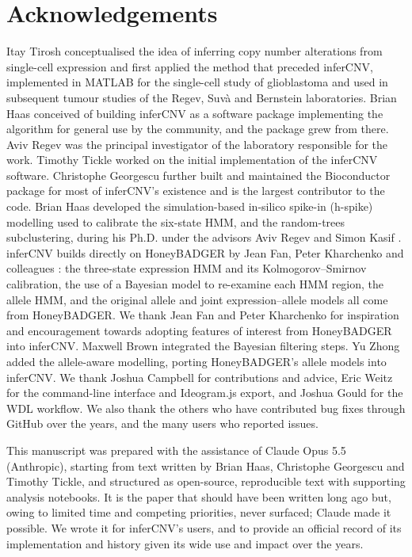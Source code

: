 \section*{Acknowledgements}\label{sec:acknowledgements}

Itay Tirosh conceptualised the idea of inferring copy number alterations from single-cell expression and first applied the method that preceded inferCNV, implemented in MATLAB for the single-cell study of glioblastoma \citep{patel2014} and used in subsequent tumour studies of the Regev, Suvà and Bernstein laboratories. Brian Haas conceived of building inferCNV as a software package implementing the algorithm for general use by the community, and the package grew from there. Aviv Regev was the principal investigator of the laboratory responsible for the work. Timothy Tickle worked on the initial implementation of the inferCNV software. Christophe Georgescu further built and maintained the Bioconductor package for most of inferCNV's existence and is the largest contributor to the code. Brian Haas developed the simulation-based in-silico spike-in (h-spike) modelling used to calibrate the six-state HMM, and the random-trees subclustering, during his Ph.D. under the advisors Aviv Regev and Simon Kasif \citep{haas2021thesis}. inferCNV builds directly on HoneyBADGER by Jean Fan, Peter Kharchenko and colleagues \citep{fan2018}: the three-state expression HMM and its Kolmogorov--Smirnov calibration, the use of a Bayesian model to re-examine each HMM region, the allele HMM, and the original allele and joint expression--allele models all come from HoneyBADGER. We thank Jean Fan and Peter Kharchenko for inspiration and encouragement towards adopting features of interest from HoneyBADGER into inferCNV. Maxwell Brown integrated the Bayesian filtering steps. Yu Zhong added the allele-aware modelling, porting HoneyBADGER's allele models into inferCNV. We thank Joshua Campbell for contributions and advice, Eric Weitz for the command-line interface and Ideogram.js export, and Joshua Gould for the WDL workflow. We also thank the others who have contributed bug fixes through GitHub over the years, and the many users who reported issues.

This manuscript was prepared with the assistance of Claude Opus 5.5 (Anthropic), starting from text written by Brian Haas, Christophe Georgescu and Timothy Tickle, and structured as open-source, reproducible text with supporting analysis notebooks. It is the paper that should have been written long ago but, owing to limited time and competing priorities, never surfaced; Claude made it possible. We wrote it for inferCNV's users, and to provide an official record of its implementation and history given its wide use and impact over the years.
